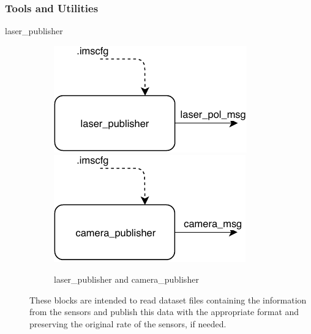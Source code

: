 \subsubsection{Tools and Utilities}
\begin{description}

\item[laser\_publisher] \hfill
\begin{figure}[ht!]
\centering
\includegraphics[scale=1]{fig/3/laser_publisher.pdf}
\includegraphics[scale=1]{fig/3/camera_publisher.pdf}
\caption{laser\_publisher and camera\_publisher}
\label{sensors_publishers}
\end{figure}

These blocks are intended to read dataset files containing the information from the sensors and publish this data with the appropriate format and preserving the original rate of the sensors, if needed.




\end{description}

